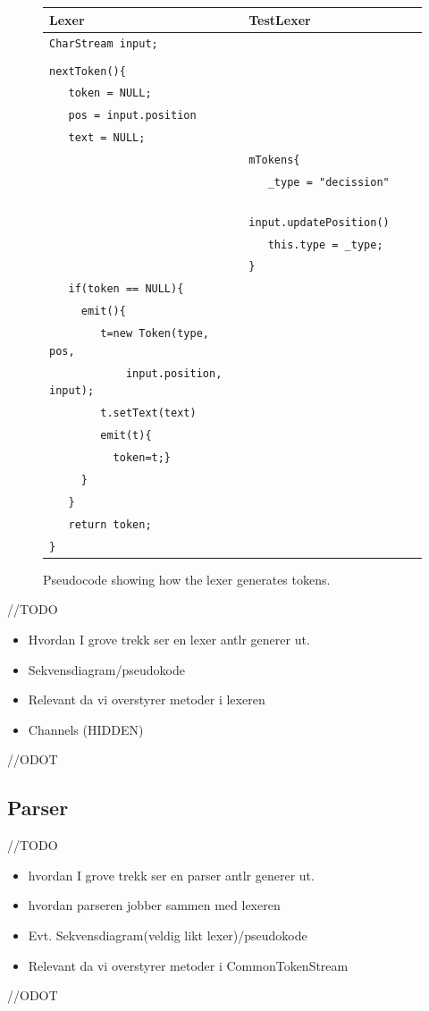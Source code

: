 \begin{figure}[h]
\centering
\begin{tabular}{|l|l|l|} \hline
\textbf{Lexer} 				& \textbf{TestLexer} 			\\ \hline
\verb!CharStream input;!		& 					\\
					&					\\
\verb!nextToken(){!			&					\\
\verb!   token = NULL;!			&					\\
\verb!   pos = input.position!		&					\\
\verb!   text = NULL;!			&					\\
					& \verb!mTokens{!			\\ 
					& \verb!   _type = "decission"!		\\
					& \verb!   input.updatePosition()!	\\
					& \verb!   this.type = _type;!		\\
					& \verb!}!				\\
\verb!   if(token == NULL){!		&					\\
\verb!     emit(){!			&					\\
\verb!        t=new Token(type, pos,! 	&					\\
\verb!            input.position, input);!&					\\ 
\verb!        t.setText(text)!		&					\\
\verb!        emit(t){!			&					\\
\verb!          token=t;}!		&					\\
\verb!     }!				&					\\
\verb!   }!				&					\\
\verb!   return token;!			&					\\
\verb!}!				&					\\ \hline
\end{tabular}
\caption{Pseudocode showing how the lexer generates tokens.}
\label{fig:nextToken}
\end{figure}


//TODO
\begin{itemize}
\item Hvordan I grove trekk ser en lexer antlr generer ut. 
\item Sekvensdiagram/pseudokode
\item Relevant da vi overstyrer metoder i lexeren
\item Channels (HIDDEN)
\end{itemize}
//ODOT

\subsection{Parser}
//TODO
\begin{itemize}
\item hvordan I grove trekk ser en parser antlr generer ut.
\item hvordan parseren jobber sammen med lexeren  
\item Evt. Sekvensdiagram(veldig likt lexer)/pseudokode 
\item Relevant da vi overstyrer metoder i CommonTokenStream
\end{itemize}
//ODOT

